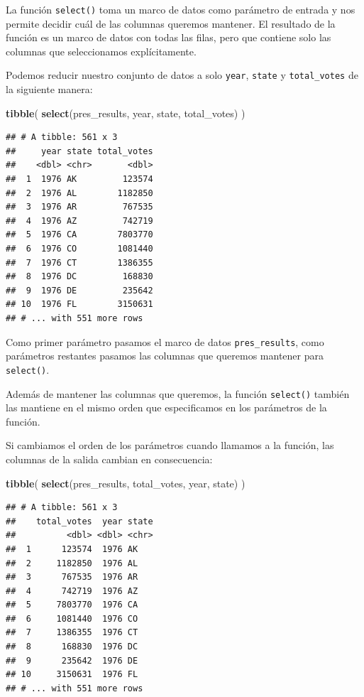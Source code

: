 \documentclass[
]{book}
\newenvironment{Shaded}{\begin{snugshade}}{\end{snugshade}}
\newcommand{\KeywordTok}[1]{\textcolor[rgb]{0.13,0.29,0.53}{\textbf{#1}}}
\newcommand{\NormalTok}[1]{#1}
\begin{document}
La función \texttt{select()} toma un marco de datos como parámetro de entrada y nos permite decidir cuál de las columnas queremos mantener. El resultado de la función es un marco de datos con todas las filas, pero que contiene solo las columnas que seleccionamos explícitamente.

Podemos reducir nuestro conjunto de datos a solo \texttt{year}, \texttt{state} y \texttt{total\_votes} de la siguiente manera:

\begin{Shaded}
\begin{Highlighting}[]
\KeywordTok{tibble}\NormalTok{(}
\KeywordTok{select}\NormalTok{(pres_results, year, state, total_votes)}
\NormalTok{)}
\end{Highlighting}
\end{Shaded}

\begin{verbatim}
## # A tibble: 561 x 3
##     year state total_votes
##    <dbl> <chr>       <dbl>
##  1  1976 AK         123574
##  2  1976 AL        1182850
##  3  1976 AR         767535
##  4  1976 AZ         742719
##  5  1976 CA        7803770
##  6  1976 CO        1081440
##  7  1976 CT        1386355
##  8  1976 DC         168830
##  9  1976 DE         235642
## 10  1976 FL        3150631
## # ... with 551 more rows
\end{verbatim}

Como primer parámetro pasamos el marco de datos \texttt{pres\_results}, como parámetros restantes pasamos las columnas que queremos mantener para \texttt{select()}.

Además de mantener las columnas que queremos, la función \texttt{select()} también las mantiene en el mismo orden que especificamos en los parámetros de la función.

Si cambiamos el orden de los parámetros cuando llamamos a la función, las columnas de la salida cambian en consecuencia:

\begin{Shaded}
\begin{Highlighting}[]
\KeywordTok{tibble}\NormalTok{(}
\KeywordTok{select}\NormalTok{(pres_results, total_votes, year, state)}
\NormalTok{)}
\end{Highlighting}
\end{Shaded}

\begin{verbatim}
## # A tibble: 561 x 3
##    total_votes  year state
##          <dbl> <dbl> <chr>
##  1      123574  1976 AK   
##  2     1182850  1976 AL   
##  3      767535  1976 AR   
##  4      742719  1976 AZ   
##  5     7803770  1976 CA   
##  6     1081440  1976 CO   
##  7     1386355  1976 CT   
##  8      168830  1976 DC   
##  9      235642  1976 DE   
## 10     3150631  1976 FL   
## # ... with 551 more rows
\end{verbatim}
\end{document}
